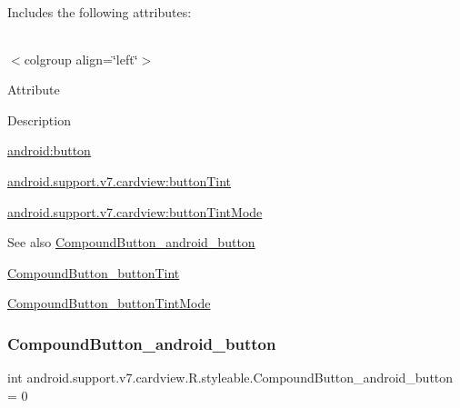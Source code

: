 Includes the following attributes\+:

\tabulinesep=1mm
\begin{longtabu} spread 0pt [c]{*{0}{|X[-1]}|}
\hline
\end{longtabu}
$<$colgroup align=\char`\"{}left\char`\"{}$>$ 

Attribute

Description 

{\ttfamily \hyperlink{classandroid_1_1support_1_1v7_1_1cardview_1_1R_1_1styleable_a66228106fdc1cf9fd3fa56bd70058c1d}{android\+:button}}

{\ttfamily \hyperlink{classandroid_1_1support_1_1v7_1_1cardview_1_1R_1_1styleable_a7295e2bf20744e3120536704e8484f05}{android.\+support.\+v7.\+cardview\+:button\+Tint}}

{\ttfamily \hyperlink{classandroid_1_1support_1_1v7_1_1cardview_1_1R_1_1styleable_a2ca542fc884ad767a454fac8fce935bb}{android.\+support.\+v7.\+cardview\+:button\+Tint\+Mode}}

\begin{DoxySeeAlso}{See also}
\hyperlink{classandroid_1_1support_1_1v7_1_1cardview_1_1R_1_1styleable_a66228106fdc1cf9fd3fa56bd70058c1d}{Compound\+Button\+\_\+android\+\_\+button} 

\hyperlink{classandroid_1_1support_1_1v7_1_1cardview_1_1R_1_1styleable_a7295e2bf20744e3120536704e8484f05}{Compound\+Button\+\_\+button\+Tint} 

\hyperlink{classandroid_1_1support_1_1v7_1_1cardview_1_1R_1_1styleable_a2ca542fc884ad767a454fac8fce935bb}{Compound\+Button\+\_\+button\+Tint\+Mode} 
\end{DoxySeeAlso}
\mbox{\label{classandroid_1_1support_1_1v7_1_1cardview_1_1R_1_1styleable_a66228106fdc1cf9fd3fa56bd70058c1d}} 
\subsubsection{\texorpdfstring{Compound\+Button\+\_\+android\+\_\+button}{CompoundButton\_android\_button}}
{\footnotesize\ttfamily int android.\+support.\+v7.\+cardview.\+R.\+styleable.\+Compound\+Button\+\_\+android\+\_\+button = 0\hspace{0.3cm}{\ttfamily [static]}}

